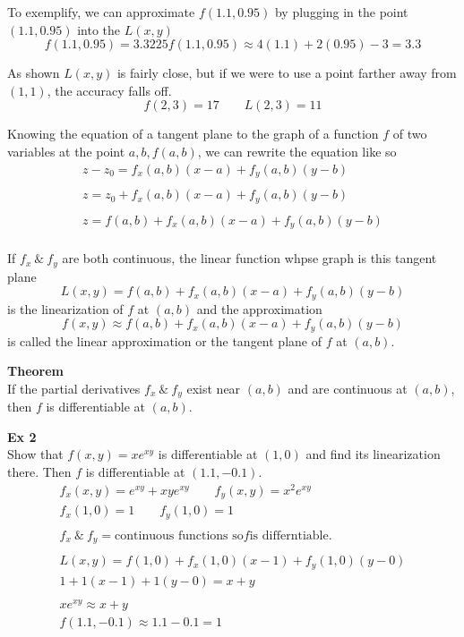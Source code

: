 \documentclass{article}
\begin{document}
  To exemplify, we can approximate $ f(1.1,0.95)$ by plugging in the point $ (1.1,0.95) $ into the $ L(x,y) $ 
  \[
    f(1.1,0.95)=3.3225
    f(1.1,0.95) \approx 4(1.1) + 2(0.95)-3=3.3
  \]
  
  As shown $ L(x,y) $ is fairly close, but if we were to use a point farther away from $ (1,1) $, the accuracy falls off.
  \[
    f(2,3)=17 \qquad L(2,3)=11
  \]
  
  Knowing the equation of a tangent plane to the graph of a function $ f $ of two variables at the point $ a,b,f(a,b)$, we can rewrite the equation like so  
  \[
    \begin{gathered}
     z-z_{0}=f_{x}(a,b  )(x-a)+f_{y}(a,b)(y-b)\\
     ~\\
     z=z_{0}+f_{x}(a,b  )(x-a)+f_{y}(a,b  )(y-b)\\
     ~\\
     z=f(a,b) +f_{x}(a,b  )(x-a)+f_{y}(a,b  )(y-b)\\
    \end{gathered}
  \]

  If $ f_{x} ~\&~ f_{y}$ are both continuous, the linear function whpse graph is this tangent plane
  \[
    L(x,y)=f(a,b)+f_{x}(a,b)(x-a)+f_{y}(a,b)(y-b)  
  \]
  is the linearization of $ f $ at $ (a,b) $ and the approximation
  \[
  f(x,y)\approx f(a,b)+f_{x}(a,b)(x-a)+f_{y}(a,b)(y-b)
  \]
  is called the linear approximation or the tangent plane of $ f $ at $ (a,b) $.

  \textbf{Theorem}\\
  If the partial derivatives $ f_{x} ~\&~ f_{y} $ exist near $ (a,b) $ and are continuous at $ (a,b) $, then $ f $ is differentiable at $ (a,b) $.     

  \textbf{Ex 2}\\
  Show that $ f(x,y)=xe^{xy}  $ is differentiable at $ (1,0) $ and find its linearization there. Then $ f $ is differentiable at $ (1.1,-0.1)$.
  \[
    \begin{gathered}
      f_{x}(x,y)=e^{xy}+xye^{xy} \qquad f_{y}(x,y)=x^{2}e^{xy}\\
      f_{x}(1,0)=1 \qquad f_{y}(1,0) = 1\\
      ~\\
      f_{x} ~\&~ f_{y}=\text{continuous functions so} f \text{is differntiable.}\\
      ~\\
      L(x,y)=f(1,0)+f_{x}(1,0)(x-1)+f_{y}(1,0)(y-0)\\
      1+1(x-1) + 1(y-0)=x+y\\
      ~\\
      \boxed{xe^{xy}\approx x+y}\\
    f(1.1,-0.1) \approx 1.1 - 0.1 = \boxed{1} 
    \end{gathered}
  \]
\end{document}
